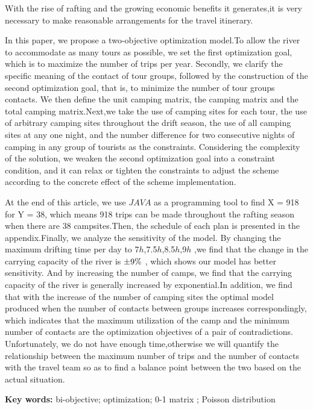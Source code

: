 \noindent	
With the rise of rafting and the growing economic benefits it generates,it is very necessary to make reasonable arrangements for the travel itinerary.
\par In this paper, we propose a two-objective optimization model.To allow the river to accommodate as many tours as possible, we set the first optimization goal, which is to maximize the number of trips per year. Secondly, we clarify the specific meaning of the contact of tour groups, followed by the construction of the second optimization goal, that is, to minimize the number of tour groups contacts. We then define the unit camping matrix, the camping matrix and the total camping matrix.Next,we take the use of camping sites for each tour, the use of arbitrary camping sites throughout the drift season, the use of all camping sites at any one night, and the number difference for two consecutive nights of camping in any group of tourists as the constraints. Considering the complexity of the solution, we weaken the second optimization goal into a constraint condition, and it can relax or tighten the constraints to adjust the scheme according to the concrete effect of the scheme implementation.
\par At the end of this article, we use $JAVA$ as a programming tool to find X = 918 for Y = 38, which means 918 trips can be made throughout the rafting season when there are 38 campsites.Then, the schedule of each plan is presented in the appendix.Finally, we analyze the sensitivity of the model. By changing the maximum drifting time per day to 7$h$,7.5$h$,8.5$h$,9$h$ ,we find that the change in the carrying capacity of the river is $ \pm 9{\rm{\% }}$ , which shows our model has better sensitivity. And by increasing the number of camps, we find that the carrying capacity of the river is generally increased by exponential.In addition, we  find that with the increase of the number of camping sites the optimal model produced when the number of contacts between groups increases correspondingly, which indicates that the maximum utilization of the camp and the minimum number of contacts are the optimization objectives of a pair of contradictions. Unfortunately, we do not have enough time,otherwise we will quantify the relationship between the maximum number of trips and the number of contacts with the travel team so as to find a balance point between the two based on the actual situation.
\\
\par
\noindent
\textbf{Key words:} bi-objective; optimization; 0-1 matrix ; Poisson distribution









